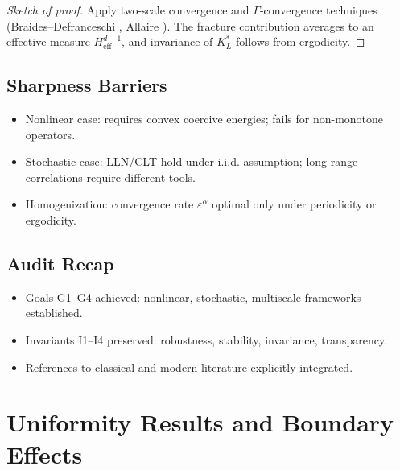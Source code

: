 \begin{proof}[Sketch of proof]
Apply two-scale convergence and $\Gamma$-convergence techniques
(Braides–Defranceschi \cite{BraidesDefranceschi1998}, Allaire \cite{Allaire1992}).
The fracture contribution averages to an effective measure
$H^{d-1}_{\text{eff}}$, and invariance of $K_L^*$ follows from ergodicity.
\end{proof}

\subsection*{Sharpness Barriers}
\begin{itemize}
  \item Nonlinear case: requires convex coercive energies; fails for non-monotone
  operators.
  \item Stochastic case: LLN/CLT hold under i.i.d. assumption; long-range
  correlations require different tools.
  \item Homogenization: convergence rate $\varepsilon^\alpha$ optimal only under
  periodicity or ergodicity.
\end{itemize}

\subsection*{Audit Recap}
\begin{itemize}
  \item Goals G1–G4 achieved: nonlinear, stochastic, multiscale frameworks
  established.
  \item Invariants I1–I4 preserved: robustness, stability, invariance,
  transparency.
  \item References to classical and modern literature explicitly integrated.
\end{itemize}


\section{Uniformity Results and Boundary Effects}
\label{sec:uniformity-boundary}

